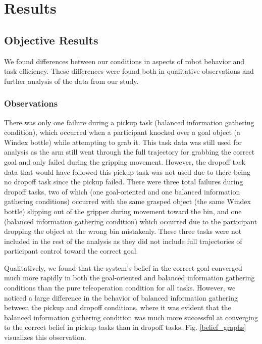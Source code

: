 \documentclass[conference]{IEEEtran}
\begin{document}
\section{Results}

\subsection{Objective Results}

We found differences between our conditions in aspects of robot behavior and task efficiency. These differences were found both in qualitative observations and further analysis of the data from our study.

\subsubsection{Observations}
There was only one failure during a pickup task (balanced information gathering condition), which occurred when a participant knocked over a goal object (a Windex bottle) while attempting to grab it. This task data was still used for analysis as the arm still went through the full trajectory for grabbing the correct goal and only failed during the gripping movement. However, the dropoff task data that would have followed this pickup task was not used due to there being no dropoff task since the pickup failed. There were three total failures during dropoff tasks, two of which (one goal-oriented and one balanced information gathering conditions) occurred with the same grasped object (the same Windex bottle) slipping out of the gripper during movement toward the bin, and one (balanced information gathering condition) which occurred due to the participant dropping the object at the wrong bin mistakenly. These three tasks were not included in the rest of the analysis as they did not include full trajectories of participant control toward the correct goal.

Qualitatively, we found that the system's belief in the correct goal converged much more rapidly in both the goal-oriented and balanced information gathering conditions than the pure teleoperation condition for all tasks. However, we noticed a large difference in the behavior of balanced information gathering between the pickup and dropoff conditions, where it was evident that the balanced information gathering condition was much more successful at converging to the correct belief in pickup tasks than in dropoff tasks. Fig. \ref{belief_graphs} visualizes this observation.
\end{document}
